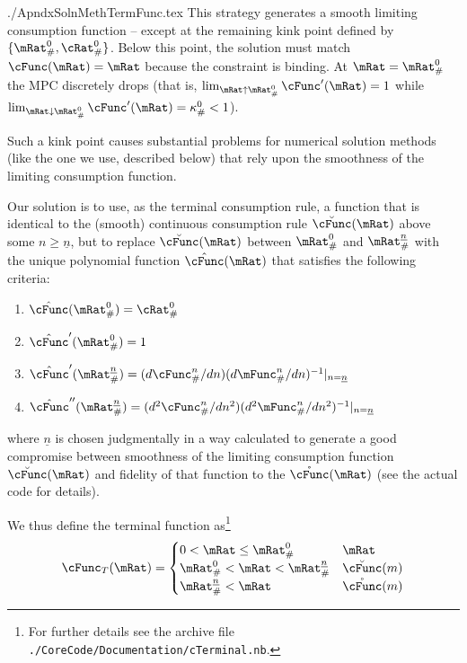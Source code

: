 \documentclass{econtex}
\begin{document}
\begin{verbatimwrite}{./ApndxSolnMethTermFunc.tex}
This strategy generates a smooth limiting consumption function --
except at the remaining kink point defined by
$\{\mRat_{\#}^{0},\cRat_{\#}^{0}\}$.  Below this point, the solution
must match $\cFunc(\mRat)=\mRat$ because the constraint is binding.
At $\mRat=\mRat_{\#}^{0}$ the MPC discretely drops (that is,
$\lim_{\mRat \uparrow \mRat^{0}_{\#}} \cFunc^{\prime}(\mRat)= 1$ while
$\lim_{\mRat \downarrow \mRat^{0}_{\#}}\cFunc^{\prime}(\mRat) =
\kappa_{\#}^{0} < 1$).  

Such a kink point causes substantial problems for numerical solution methods (like the one we use, described below) that rely upon the smoothness of the limiting consumption function.

Our solution is to use, as the terminal consumption rule, a function
that is identical to the (smooth) continuous consumption rule 
$\breve{\cFunc}(\mRat)$ above some $n \geq \underline{n}$, but to
replace $\breve{\cFunc}(\mRat)$ between $\mRat_{\#}^{0}$ and
$\mRat_{\#}^{\underline{n}}$ with the unique polynomial function
$\hat{\cFunc}(\mRat)$ that satisfies the following criteria:
\begin{enumerate}
\item $\hat{\cFunc}(\mRat_{\#}^{0})  = \cRat_{\#}^{0}$
\item $\hat{\cFunc}^{\prime}(\mRat_{\#}^{0}) = 1$
\item $\hat{\cFunc}^{\prime}(\mRat_{\#}^{\underline{n}}) = (d \cFunc_{\#}^{n}/d n)(d \mFunc_{\#}^{n}/d n)^{-1}|_{n=\underline{n}}$
\item $\hat{\cFunc}^{\prime\prime}(\mRat_{\#}^{\underline{n}}) = (d^{2} \cFunc_{\#}^{n}/d n^{2})(d^{2} \mFunc_{\#}^{n}/d n^{2})^{-1}|_{n=\underline{n}}$
\end{enumerate}
where $\underline{n}$ is chosen judgmentally in a way calculated to
generate a good compromise between smoothness of the limiting
consumption function $\breve{\cFunc}(\mRat)$ and fidelity of that
function to the $\mathring{\cFunc}(\mRat)$ (see the actual code for
details).

We thus define the terminal function as\footnote{For further details see the archive file \texttt{./CoreCode/Documentation/cTerminal.nb}.}
\begin{equation}
\cFunc_{T}(\mRat) = 
\begin{cases}
 0 < \mRat \leq \mRat_{\#}^{0} & \mRat \\
 \mRat_{\#}^{0} < \mRat < \mRat_{\#}^{\underline{n}}      & \breve{\cFunc}(m) \\
 \mRat_{\#}^{\underline{n}} < \mRat  & \mathring{\cFunc}(m)
\end{cases}
\end{equation}



\end{verbatimwrite}
\end{document}
